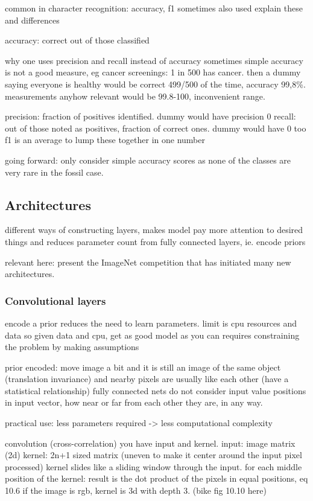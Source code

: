 \documentclass{article}
\begin{document}
common in character recognition: accuracy, f1 sometimes also used 
explain these and differences 

accuracy: correct out of those classified

why one uses precision and recall instead of accuracy
sometimes simple accuracy is not a good measure, eg cancer screenings: 1 in 500 has cancer.
then a dummy saying everyone is healthy would be correct 499/500 of the time, accuracy
99,8\%. measurements anyhow relevant would be 99.8-100, inconvenient range.

precision: fraction of positives identified. dummy would have precision 0
recall: out of those noted as positives, fraction of correct ones. dummy would have 0 too 
f1 is an average to lump these together in one number 

going forward: only consider simple accuracy scores as none of the classes are very rare 
in the fossil case.

\subsection{Architectures}

different ways of constructing layers, makes model pay more attention to desired things 
and reduces parameter count from fully connected layers, ie. encode priors \cite{alexnet}

relevant here: present the ImageNet competition that has initiated many new architectures.

\subsubsection{Convolutional layers}


encode a prior reduces the need to learn parameters. limit is cpu resources and data so given data 
and cpu, get as good model as you can requires constraining the problem by making assumptions \cite{alexnet}

prior encoded: move image a bit and it is still an image of the same object (translation invariance)
and nearby pixels are usually like each other (have a statistical relationship) fully connected nets 
do not consider input value positions in input vector, how near or far from each other they are, in any way.
\cite{princebook}

practical use: less parameters required -> less computational complexity

convolution (cross-correlation)
you have input and kernel. input: image matrix (2d) kernel: 2n+1 sized matrix (uneven to make it center around the input pixel processed)
kernel slides like a sliding window through the input. for each middle position of the kernel:
result is the dot product of the pixels in equal positions, eq 10.6
if the image is rgb, kernel is 3d with depth 3. (bike fig 10.10 here)
\end{document}
